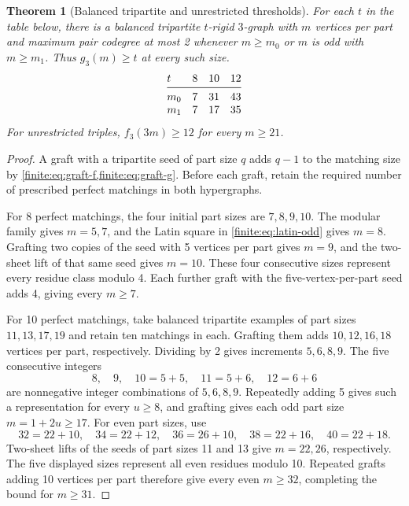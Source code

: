 \documentclass[10pt]{article}
\numberwithin{equation}{section}
\newtheorem{theorem}{Theorem}[section]
\begin{document}
\begin{theorem}[Balanced tripartite and unrestricted thresholds]\label{finite:thm:thresholds}
For each $t$ in the table below, there is a balanced tripartite $t$-rigid $3$-graph with $m$ vertices per part and maximum pair codegree at most 2 whenever $m\ge m_0$ or $m$ is odd with $m\ge m_1$. Thus $g_3(m)\ge t$ at every such size.
\[
\begin{array}{@{}l*{3}{r}@{}}
 t   &8&10&12\\
 \midrule
 m_0 &7&31&43\\
 m_1 &7&17&35
\end{array}
\]
For unrestricted triples, $f_3(3m)\ge12$ for every $m\ge21$.
\end{theorem}
\begin{proof}
A graft with a tripartite seed of part size $q$ adds $q-1$ to the matching size by \cref{finite:eq:graft-f,finite:eq:graft-g}. Before each graft, retain the required number of prescribed perfect matchings in both hypergraphs.

For 8 perfect matchings, the four initial part sizes are $7,8,9,10$. The modular family gives $m=5,7$, and the Latin square in \cref{finite:eq:latin-odd} gives $m=8$. Grafting two copies of the seed with 5 vertices per part gives $m=9$, and the two-sheet lift of that same seed gives $m=10$. These four consecutive sizes represent every residue class modulo 4. Each further graft with the five-vertex-per-part seed adds 4, giving every $m\ge7$.

For 10 perfect matchings, take balanced tripartite examples of part sizes $11,13,17,19$ and retain ten matchings in each. Grafting them adds $10,12,16,18$ vertices per part, respectively. Dividing by 2 gives increments $5,6,8,9$. The five consecutive integers
\[
 8,\quad9,\quad10=5+5,\quad11=5+6,\quad12=6+6
\]
are nonnegative integer combinations of $5,6,8,9$. Repeatedly adding 5 gives such a representation for every $u\ge8$, and grafting gives each odd part size $m=1+2u\ge17$. For even part sizes, use
\[
 32=22+10,\quad34=22+12,\quad36=26+10,\quad
 38=22+16,\quad40=22+18.
\]
Two-sheet lifts of the seeds of part sizes 11 and 13 give $m=22,26$, respectively. The five displayed sizes represent all even residues modulo 10. Repeated grafts adding 10 vertices per part therefore give every even $m\ge32$, completing the bound for $m\ge31$.


\end{proof}
\end{document}
